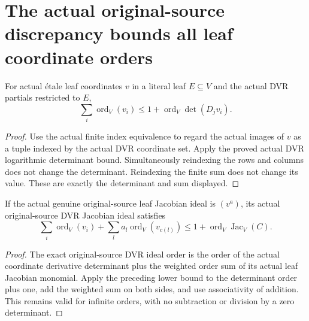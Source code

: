 \section{The actual original-source discrepancy bounds all leaf coordinate orders}

\begin{lemma}\label{lem:sc0-dvr-leaf-coordinate-logarithmic-bound}
\leanok
{}
For actual \'etale leaf coordinates $v$ in a literal leaf $E\subseteq V$
and the actual DVR partials restricted to $E$,
\[
 \sum_i\operatorname{ord}_V(v_i)\le 1+
 \operatorname{ord}_V\det(D_jv_i).
\]
\end{lemma}
\begin{proof}
Use the actual finite index equivalence to regard the actual images of $v$
as a tuple indexed by the actual DVR coordinate set. Apply the proved
actual DVR logarithmic determinant bound. Simultaneously reindexing the rows
and columns does not change the determinant. Reindexing the finite sum does
not change its value. These are exactly the determinant and sum displayed.
\end{proof}

\begin{theorem}\label{thm:sc0-dvr-original-source-leaf-logarithmic-bound}
\leanok
{}
If the actual genuine original-source leaf Jacobian ideal is $(v^a)$, its
actual original-source DVR Jacobian ideal satisfies
\[
 \sum_i\operatorname{ord}_V(v_i)+\sum_l a_l\operatorname{ord}_V(v_{c(l)})
 \le 1+\operatorname{ord}_V\operatorname{Jac}_V(C).
\]
\end{theorem}
\begin{proof}
The exact original-source DVR ideal order is the order of the actual
coordinate derivative determinant plus the weighted order sum of its actual
leaf Jacobian monomial. Apply the preceding lower bound to the determinant
order plus one, add the weighted sum on both sides, and use associativity
of addition. This remains valid for infinite orders, with no subtraction
or division by a zero determinant.
\end{proof}
